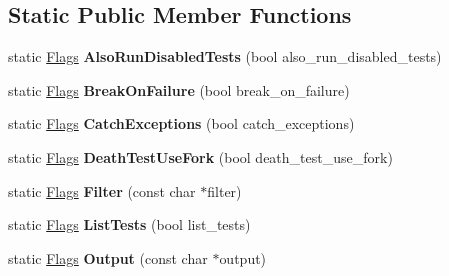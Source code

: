 \subsection*{Static Public Member Functions}
\begin{DoxyCompactItemize}
\item 
\mbox{\label{structtesting_1_1_flags_a8bee2b5f94d8248b6791d6b005db146f}} 
static \mbox{\hyperlink{structtesting_1_1_flags}{Flags}} {\bfseries Also\+Run\+Disabled\+Tests} (bool also\+\_\+run\+\_\+disabled\+\_\+tests)
\item 
\mbox{\label{structtesting_1_1_flags_a62660e44922321f7640bc951a04c2296}} 
static \mbox{\hyperlink{structtesting_1_1_flags}{Flags}} {\bfseries Break\+On\+Failure} (bool break\+\_\+on\+\_\+failure)
\item 
\mbox{\label{structtesting_1_1_flags_a2c7d89f62f4328ae0ced66154ef96b44}} 
static \mbox{\hyperlink{structtesting_1_1_flags}{Flags}} {\bfseries Catch\+Exceptions} (bool catch\+\_\+exceptions)
\item 
\mbox{\label{structtesting_1_1_flags_a4468e5625833043596c44be174349d8c}} 
static \mbox{\hyperlink{structtesting_1_1_flags}{Flags}} {\bfseries Death\+Test\+Use\+Fork} (bool death\+\_\+test\+\_\+use\+\_\+fork)
\item 
\mbox{\label{structtesting_1_1_flags_afc7350b7c1ac4c0e0efe2d9a94729eb7}} 
static \mbox{\hyperlink{structtesting_1_1_flags}{Flags}} {\bfseries Filter} (const char $\ast$filter)
\item 
\mbox{\label{structtesting_1_1_flags_a825a5d763a31fe6c28f543990bd336df}} 
static \mbox{\hyperlink{structtesting_1_1_flags}{Flags}} {\bfseries List\+Tests} (bool list\+\_\+tests)
\item 
\mbox{\label{structtesting_1_1_flags_a507916734a6d7ff2dd02891d7849f2d3}} 
static \mbox{\hyperlink{structtesting_1_1_flags}{Flags}} {\bfseries Output} (const char $\ast$output)
\item 
\mbox{\label{structtesting_1_1_flags_af4dc8454995fb3691399a049e95de179}} 

\end{DoxyCompactItemize}
